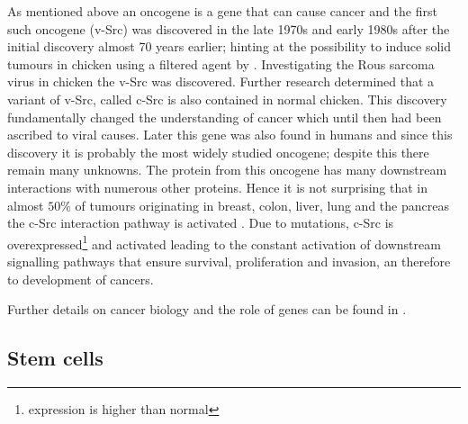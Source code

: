 As mentioned above an oncogene is a gene that can cause cancer and the first such oncogene (v-Src) was discovered in the late 1970s and early 1980s \cite{Martin:2001jx} after the initial discovery almost 70 years earlier; hinting at the possibility to induce solid tumours in chicken using a filtered agent by \cite{Rous:1911uf}. Investigating the Rous sarcoma virus in chicken the v-Src was discovered. Further research determined that a variant of v-Src, called c-Src is also contained in normal chicken. This discovery  fundamentally changed the understanding of cancer which until then had been ascribed to  viral causes. Later this gene was also found in humans and since this discovery it is probably the most widely studied oncogene; despite this there remain many unknowns. The protein from this oncogene has many downstream interactions with numerous other proteins. Hence it is not surprising that in almost $50\%$ of tumours originating in breast, colon, liver, lung and the pancreas the c-Src interaction pathway is activated \cite{Dehm:2013fr}. Due to mutations, c-Src is overexpressed\footnote{expression is higher than normal} and activated leading to the constant activation of downstream signalling pathways that ensure survival, proliferation and invasion, an therefore to development of cancers.

Further details on cancer biology and the role of genes can be found in \cite{Weinberg:2013uu}.

\subsection{Stem cells}
\label{sec:stem-cells}

